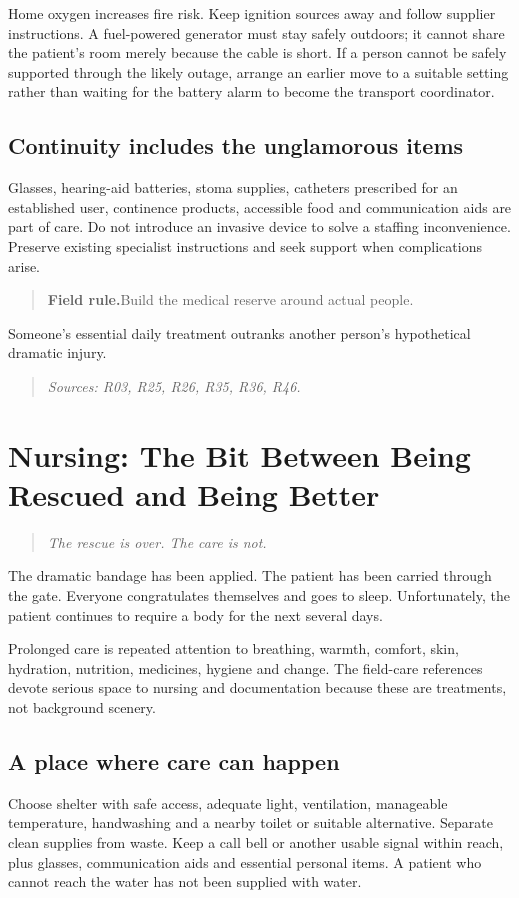 \documentclass[10pt,openright]{book}
\newcommand{\fieldrule}[1]{\begin{quote}\textbf{Field rule.}\enspace #1\end{quote}}
\begin{document}
Home oxygen increases fire risk. Keep ignition sources away and follow supplier instructions. A fuel-powered generator must stay safely outdoors; it cannot share the patient's room merely because the cable is short. If a person cannot be safely supported through the likely outage, arrange an earlier move to a suitable setting rather than waiting for the battery alarm to become the transport coordinator.

\section*{Continuity includes the unglamorous items}
Glasses, hearing-aid batteries, stoma supplies, catheters prescribed for an established user, continence products, accessible food and communication aids are part of care. Do not introduce an invasive device to solve a staffing inconvenience. Preserve existing specialist instructions and seek support when complications arise.

\fieldrule{Build the medical reserve around actual people.}
Someone's essential daily treatment outranks another person's hypothetical dramatic injury.

\begin{quote}\emph{Sources: R03, R25, R26, R35, R36, R46.}\end{quote}

\chapter{Nursing: The Bit Between Being Rescued and Being Better}
\begin{quote}\emph{The rescue is over. The care is not.}\end{quote}
The dramatic bandage has been applied. The patient has been carried through the gate. Everyone congratulates themselves and goes to sleep. Unfortunately, the patient continues to require a body for the next several days.

Prolonged care is repeated attention to breathing, warmth, comfort, skin, hydration, nutrition, medicines, hygiene and change. The field-care references devote serious space to nursing and documentation because these are treatments, not background scenery.

\section*{A place where care can happen}
Choose shelter with safe access, adequate light, ventilation, manageable temperature, handwashing and a nearby toilet or suitable alternative. Separate clean supplies from waste. Keep a call bell or another usable signal within reach, plus glasses, communication aids and essential personal items. A patient who cannot reach the water has not been supplied with water.
\end{document}
